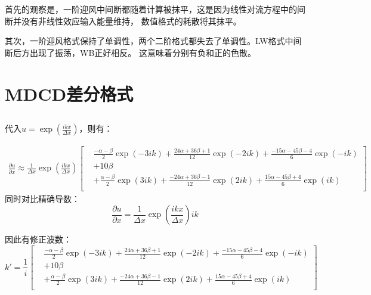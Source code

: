 \documentclass[UTF8,zihao=5]{ctexart} %
\newcommand*{\pd}[2]{\frac{\partial #1}{\partial #2}}
\newcommand*{\inc}[0]{{\Delta}}
\begin{document}
首先的观察是，一阶迎风中间断都随着计算被抹平，这是因为线性对流方程中的间断并没有非线性效应输入能量维持，
数值格式的耗散将其抹平。

其次，一阶迎风格式保持了单调性，两个二阶格式都失去了单调性。LW格式中间断后方出现了振荡，WB正好相反。
这意味着分别有负和正的色散。

\section{MDCD差分格式}

\subsection{}

代入$u=\exp{(\frac{ikx}{\inc x})}$，则有：

$$
    \begin{aligned}
        \pd{u}{x}\approx
        \frac{1}{\inc x}\exp{(\frac{ikx}{\inc x})}
        \left[
            \begin{aligned}
                 &
                \frac{-\alpha - \beta}{2} \exp{(-3ik)}
                +\frac{ 24\alpha + 36\beta + 1}{12} \exp{(-2ik)}
                +\frac{-15\alpha - 45\beta - 4}{6}  \exp{(-ik)} \\
                 & +10\beta                                     \\
                 &
                +\frac{ \alpha - \beta}{2} \exp{( 3ik)}
                +\frac{-24\alpha + 36\beta - 1}{12} \exp{( 2ik)}
                +\frac{ 15\alpha - 45\beta + 4}{6}  \exp{( ik)} \\
            \end{aligned}
            \right]
    \end{aligned}
$$
同时对比精确导数：
$$
    \pd{u}{x}=\frac{1}{\inc x}\exp{(\frac{ikx}{\inc x})} ik
$$

因此有修正波数：
$$
    k'=\frac{1}{i}\left[
        \begin{aligned}
             &
            \frac{-\alpha - \beta}{2} \exp{(-3ik)}
            +\frac{ 24\alpha + 36\beta + 1}{12} \exp{(-2ik)}
            +\frac{-15\alpha - 45\beta - 4}{6}  \exp{(-ik)} \\
             & +10\beta                                     \\
             &
            +\frac{ \alpha - \beta}{2} \exp{( 3ik)}
            +\frac{-24\alpha + 36\beta - 1}{12} \exp{( 2ik)}
            +\frac{ 15\alpha - 45\beta + 4}{6}  \exp{( ik)} \\
        \end{aligned}
        \right]
$$
\end{document}
